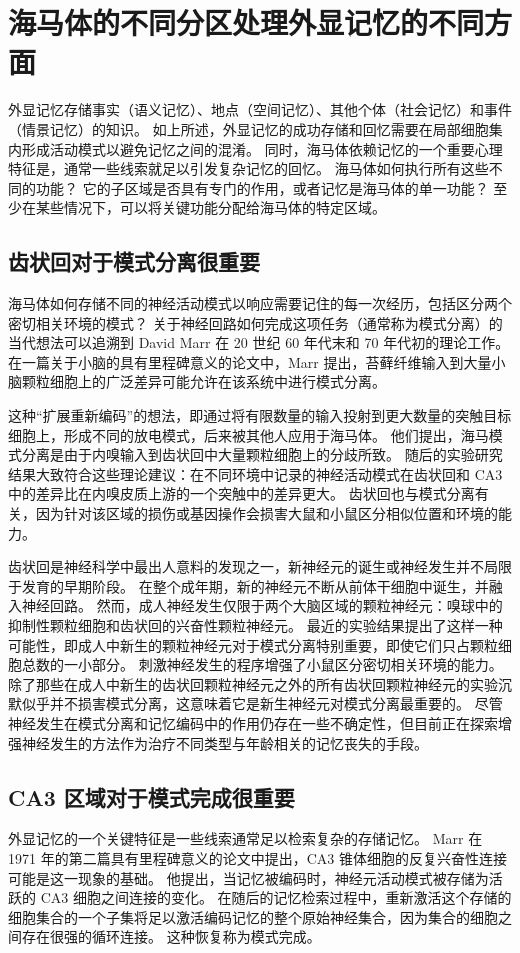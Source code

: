 \section{海马体的不同分区处理外显记忆的不同方面}

外显记忆存储事实（语义记忆）、地点（空间记忆）、其他个体（社会记忆）和事件（情景记忆）的知识。 如上所述，外显记忆的成功存储和回忆需要在局部细胞集内形成活动模式以避免记忆之间的混淆。 同时，海马体依赖记忆的一个重要心理特征是，通常一些线索就足以引发复杂记忆的回忆。 海马体如何执行所有这些不同的功能？ 它的子区域是否具有专门的作用，或者记忆是海马体的单一功能？ 至少在某些情况下，可以将关键功能分配给海马体的特定区域。



\subsection{齿状回对于模式分离很重要}
海马体如何存储不同的神经活动模式以响应需要记住的每一次经历，包括区分两个密切相关环境的模式？ 关于神经回路如何完成这项任务（通常称为模式分离）的当代想法可以追溯到 David Marr 在 20 世纪 60 年代末和 70 年代初的理论工作。 在一篇关于小脑的具有里程碑意义的论文中，Marr 提出，苔藓纤维输入到大量小脑颗粒细胞上的广泛差异可能允许在该系统中进行模式分离。

这种“扩展重新编码”的想法，即通过将有限数量的输入投射到更大数量的突触目标细胞上，形成不同的放电模式，后来被其他人应用于海马体。 他们提出，海马模式分离是由于内嗅输入到齿状回中大量颗粒细胞上的分歧所致。 随后的实验研究结果大致符合这些理论建议：在不同环境中记录的神经活动模式在齿状回和 CA3 中的差异比在内嗅皮质上游的一个突触中的差异更大。 齿状回也与模式分离有关，因为针对该区域的损伤或基因操作会损害大鼠和小鼠区分相似位置和环境的能力。

齿状回是神经科学中最出人意料的发现之一，新神经元的诞生或神经发生并不局限于发育的早期阶段。 在整个成年期，新的神经元不断从前体干细胞中诞生，并融入神经回路。 然而，成人神经发生仅限于两个大脑区域的颗粒神经元：嗅球中的抑制性颗粒细胞和齿状回的兴奋性颗粒神经元。 最近的实验结果提出了这样一种可能性，即成人中新生的颗粒神经元对于模式分离特别重要，即使它们只占颗粒细胞总数的一小部分。 刺激神经发生的程序增强了小鼠区分密切相关环境的能力。 除了那些在成人中新生的齿状回颗粒神经元之外的所有齿状回颗粒神经元的实验沉默似乎并不损害模式分离，这意味着它是新生神经元对模式分离最重要的。 尽管神经发生在模式分离和记忆编码中的作用仍存在一些不确定性，但目前正在探索增强神经发生的方法作为治疗不同类型与年龄相关的记忆丧失的手段。

\subsection{CA3 区域对于模式完成很重要}
外显记忆的一个关键特征是一些线索通常足以检索复杂的存储记忆。 Marr 在 1971 年的第二篇具有里程碑意义的论文中提出，CA3 锥体细胞的反复兴奋性连接可能是这一现象的基础。 他提出，当记忆被编码时，神经元活动模式被存储为活跃的 CA3 细胞之间连接的变化。 在随后的记忆检索过程中，重新激活这个存储的细胞集合的一个子集将足以激活编码记忆的整个原始神经集合，因为集合的细胞之间存在很强的循环连接。 这种恢复称为模式完成。

